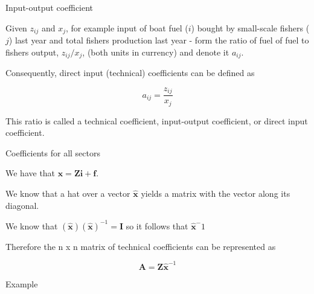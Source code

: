 \documentclass[ignorenonframetext,]{beamer}
\begin{document}
\begin{frame}{Input-output coefficient}

Given \(z_{ij}\) and \(x_j\), for example input of boat fuel (\(i\))
bought by small-scale fishers (\(j\)) last year and total fishers
production last year - form the ratio of fuel of fuel to fishers output,
\(z_{ij}/x_{j}\), (both units in currency) and denote it \(a_{ij}\).

Consequently, direct input (technical) coefficients can be defined as

\[a_{ij} = \frac{z_{ij}}{x_j}\]

This ratio is called a technical coefficient, input-output coefficient,
or direct input coefficient.

\end{frame}

\begin{frame}{Coefficients for all sectors}

We have that \(\mathbf{x} = \mathbf{Zi} + \mathbf{f}\).

We know that a hat over a vector \(\mathbf{\hat{x}}\) yields a matrix
with the vector along its diagonal.

We know that \((\mathbf{\hat{x}})(\mathbf{\hat{x}})^{-1} = \mathbf{I}\)
so it follows that \(\mathbf{\hat{x}}^-1\)

Therefore the n x n matrix of technical coefficients can be represented
as

\[\mathbf{A} = \mathbf{Z}\mathbf{\hat{x}}^{-1}\]

\end{frame}

\begin{frame}{Example}

\end{frame}
\end{document}
